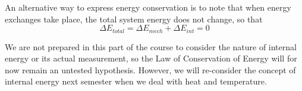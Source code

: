An alternative way to express energy conservation is to note that when energy
exchanges take place, the total system energy does not change, so that
\[
\Delta E_{total}=\Delta E_{mech}+\Delta E_{int} = 0\]


We are not prepared in this part of the course to consider the nature of internal energy or its actual measurement, so the Law of Conservation of Energy will
for now remain an untested hypothesis. However, we will re-consider the concept
of internal energy next semester when we deal with heat and temperature.

